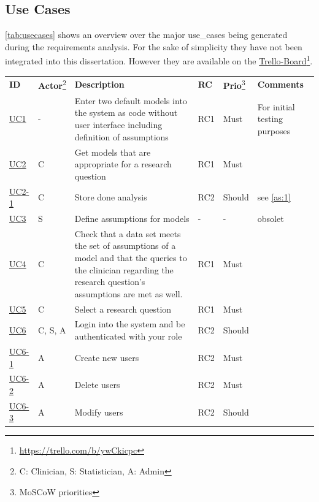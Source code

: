 \subsection{Use Cases}
\label{sub:use_cases}
\autoref{tab:usecases} shows an overview over the major \glspl{use_case} being generated during the requirements analysis. For the sake of simplicity they have not been integrated into this dissertation. However they are available on the \href{https://trello.com/b/ywCkicpc}{Trello-Board}\footnote{\url{https://trello.com/b/ywCkicpc}}.

\begin{landscape}
	\begin{longtable}{ l l p{10.5cm} l l p{3cm} }
		\textbf{ID}                         & \textbf{\Gls{Actor}}\footnote{C: Clinician, S: Statistician, A: Admin} &\textbf{Description} &  \textbf{RC} & \textbf{Prio}\footnote{MoSCoW priorities} &  \textbf{Comments}\\
		\href{https://trello.com/c/KEOokZp9}{UC1}   & 	- & 	Enter two default models into the system as code without user interface including definition of assumptions & RC1 & Must &  For initial testing purposes  \\
		\href{https://trello.com/c/ebVrFdA5}{UC2}   & 	C & 	Get models that are appropriate for a research question & RC1	& Must &	   \\
		\href{https://trello.com/c/ORRBjISQ}{UC2-1} & 	C & 	Store done analysis & RC2 & Should &  see \autoref{as:1} \\
		\href{https://trello.com/c/qKLAoWRj}{UC3} 	&  	S & 	Define assumptions for models & - & - & obsolet \\
		\href{https://trello.com/c/7NINsfz8}{UC4}   & 	C & 	Check that a data set meets the set of assumptions of a model and that the queries to the clinician regarding the research question's  assumptions are met as well. & RC1 & Must   &   \\
		\href{https://trello.com/c/22JGne3r}{UC5}   & 	C & 	Select a research question & RC1 & Must &   \\
		\href{https://trello.com/c/CVGBVWID}{UC6}   &   C, S, A & 	Login into the system and be authenticated with your role & RC2 & Should &	 \\
		\href{https://trello.com/c/pId27kJM}{UC6-1} &   A & 	Create new users & RC2 & Must &	 \\
		\href{https://trello.com/c/pQ98qgSL}{UC6-2} &  	A & 	Delete users & RC2 & Must	 &   \\
		\href{https://trello.com/c/mvxBeNSR}{UC6-3} &  	A & 	Modify users & RC2 & Should &   \\

\end{longtable}
\end{landscape}
